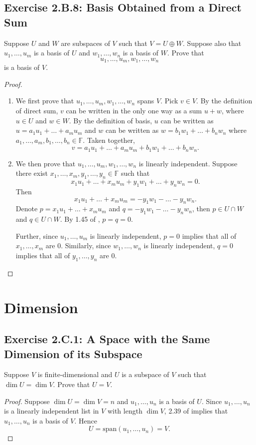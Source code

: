 \section{Exercise 2.B.8: Basis Obtained from a Direct Sum}
Suppose $U$ and $W$ are subspaces of $V$ such that $V=U\oplus W$. Suppose also that $u_1,\dots,u_m$ is a basis of $U$ and $w_1,\dots,w_n$ is a basis of $W$. Prove that \[
u_1,\dots,u_m,w_1,\dots,w_n
\] is a basis of $V$.
\begin{proof}
\begin{enumerate}
\item We first prove that $u_1,\dots,u_m,w_1,\dots,w_n$ spans $V$.
Pick $v\in V$. By the definition of direct sum, $v$ can be written in the only one way as a sum $u+w$, where $u\in U$ and $w\in W$. By the definition of basis, $u$ can be written as $u=a_1u_1+\dots+a_mu_m$ and $w$ can be written as $w=b_1w_1+\dots+b_nw_n$ where $a_1,\dots,a_m,b_1,\dots,b_n\in\mathbb{F}$. Taken together,\[
v=a_1u_1+\dots+a_mu_m+b_1w_1+\dots+b_nw_n.
\]
\item We then prove that $u_1,\dots,u_m,w_1,\dots,w_n$ is linearly independent.
Suppose there exist $x_1,\dots,x_m,y_1,\dots,y_n\in\mathbb{F}$ such that\[
x_1u_1+\dots+x_mu_m+y_1w_1+\dots+y_nw_n=0.
\] Then\[
x_1u_1+\dots+x_mu_m=-y_1w_1-\dots-y_nw_n.
\] Denote $p=x_1u_1+\dots+x_mu_m$ and $q=-y_1w_1-\dots-y_nw_n$, then $p\in U\cap W$ and $q\in U\cap W$. By 1.45 of \cite{axler2014linear}, $p=q=0$.

Further, since $u_1,\dots,u_m$ is linearly independent, $p=0$ implies that all of $x_1,\dots,x_m$ are $0$. Similarly, since $w_1,\dots,w_n$ is linearly independent, $q=0$ implies that all of $y_1,\dots,y_n$ are $0$.
\end{enumerate}
\end{proof}

\chapter{Dimension}
\section{Exercise 2.C.1: A Space with the Same Dimension of its Subspace}\label{Exercise 2.C.1}
Suppose $V$ is finite-dimensional and $U$ is a subspace of $V$ such that $\dim U=\dim V$. Prove that $U=V$.
\begin{proof}
Suppose $\dim U=\dim V=n$ and $u_1,\dots,u_n$ is a basis of $U$. Since $u_1,\dots,u_n$ is a linearly independent list in $V$ with length $\dim V$, 2.39 of \cite{axler2014linear} implies that $u_1,\dots,u_n$ is a basis of $V$. Hence\[
U=\text{span}(u_1,\dots,u_n)=V.
\]
\end{proof}

